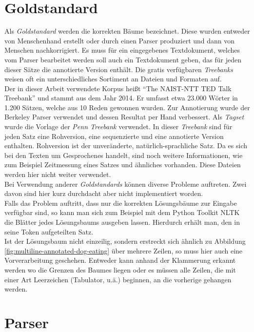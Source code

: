 \section{Goldstandard}
Als \textit{Goldstandard} werden die korrekten Bäume bezeichnet. Diese wurden entweder von Menschenhand erstellt oder durch einen Parser produziert und dann von Menschen nachkorrigiert. Es muss für ein eingegebenes Textdokument, welches vom Parser bearbeitet werden soll auch ein Textdokument geben, das für jeden dieser Sätze die annotierte Version enthält. Die gratis verfügbaren \textit{Treebanks} weisen oft ein unterschiedliches Sortiment an Dateien und Formaten auf.\\
Der in dieser Arbeit verwendete Korpus heißt ``The NAIST-NTT TED Talk Treebank'' \cite{tedtalks} und stammt aus dem Jahr 2014. Er umfasst etwa 23.000 Wörter in 1.200 Sätzen, welche aus 10 Reden gewonnen wurden. Zur Annotierung wurde der Berkeley Parser verwendet und dessen Resultat per Hand verbessert. Als \textit{Tagset} wurde die Vorlage der \textit{Penn Treebank} verwendet.
In dieser \textit{Treebank} sind für jeden Satz eine Rohversion, eine sequenzierte und eine annotierte Version enthalten. Rohversion ist der unveränderte, natürlich-sprachliche Satz. Da es sich bei den Texten um Gesprochenes handelt, sind noch weitere Informationen, wie zum Beispiel Zeitmessung eines Satzes und ähnliches vorhanden. Diese Dateien werden hier nicht weiter verwendet.\\
Bei Verwendung anderer \textit{Goldstandards} können diverse Probleme auftreten. Zwei davon sind hier kurz durchdacht aber nicht implementiert worden.\\
Falls das Problem auftritt, dass nur die korrekten Lösungsbäume zur Eingabe verfügbar sind, so kann man sich zum Beispiel mit dem Python Toolkit NLTK \cite{nltk} die Blätter jedes Lösungsbaums ausgeben lassen. Hierdurch erhält man, den in seine Token aufgeteilten Satz.\\
Ist der Lösungsbaum nicht einzeilig, sondern erstreckt sich ähnlich zu Abbildung \ref{fig:multiline-annotated-dog-eating}  über mehrere Zeilen, so muss hier auch eine Vorverarbeitung geschehen. Entweder kann anhand der Klammerung erkannt werden wo die Grenzen des Baumes liegen oder es müssen alle Zeilen, die mit einer Art Leerzeichen (Tabulator, u.ä.) beginnen, an die vorherige gehangen werden.

\section{Parser}

